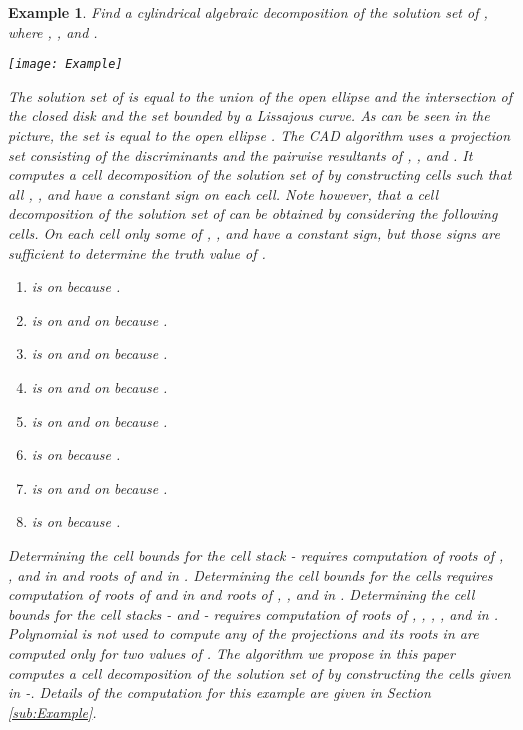 \documentclass[english]{amsart}
\numberwithin{equation}{section}
\numberwithin{figure}{section}
\newtheorem{example}[thm]{Example}
\begin{document}
\begin{example}
\label{exa:MainExample}Find a cylindrical algebraic decomposition
of the solution set of ,
where , , and .

\texttt{[image: Example]}

The solution set of  is equal to the union of the open ellipse
 and the intersection of the closed disk  and
the set  bounded by a Lissajous curve. As can be seen
in the picture, the set is equal to the open ellipse . The
CAD algorithm uses a projection set consisting of the discriminants
and the pairwise resultants of , , and . It
computes a cell decomposition of the solution set of  by constructing
 cells such that all , , and  have a
constant sign on each cell. Note however, that a cell decomposition
of the solution set of  can be obtained by considering the following
 cells. On each cell only some of , , and 
have a constant sign, but those signs are sufficient to determine
the truth value of .
\begin{enumerate}
\item  is  on 
because .
\item  is  on  and on 
because .
\item  is  on  and on 
because .
\item  is  on  and on  because .
\item  is  on  and on  because
.
\item  is  on  because .
\item  is  on  and on  because
.
\item  is  on  because .
\end{enumerate}
Determining the cell bounds for the cell stack - requires
computation of roots of , , and
 in  and roots of  and 
in . Determining the cell bounds for the cells  requires
computation of roots of  and  in
 and roots of , ,  and
 in . Determining the cell bounds for the cell stacks
- and - requires computation of roots of ,
, , ,  and 
in . Polynomial  is not used to compute any of the projections
and its roots in  are computed only for two values of . The
algorithm we propose in this paper computes a cell decomposition of
the solution set of  by constructing the  cells given in
-. Details of the computation for this example are given
in Section \ref{sub:Example}.
\end{example}
\end{document}
